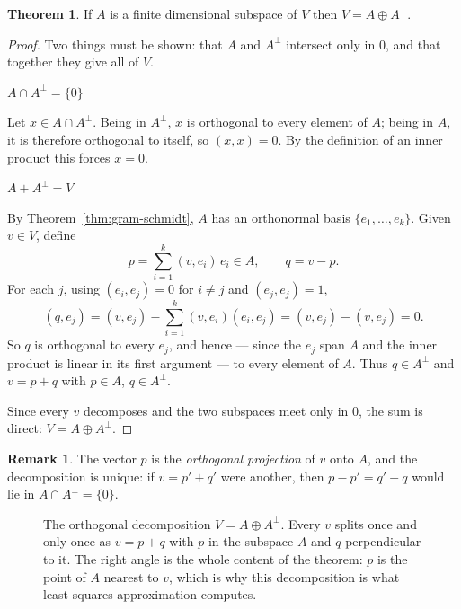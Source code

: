 \documentclass[11pt,a4paper]{article}
\theoremstyle{definition}
\newtheorem{thm}{Theorem}[subsection]
\newtheorem*{remark}{Remark}
\newcommand{\subhead}[1]{%
  \par\medskip\noindent\textbf{#1}\par\nobreak\smallskip}
\begin{document}
\begin{thm}\label{thm:orthogonal-decomposition}
If $A$ is a finite dimensional subspace of $V$ then $V=A\oplus A^{\perp}$.
\end{thm}

\begin{proof}
Two things must be shown: that $A$ and $A^{\perp}$ intersect only in $0$, and
that together they give all of $V$.

\subhead{$A\cap A^{\perp}=\{0\}$}
Let $x\in A\cap A^{\perp}$. Being in $A^{\perp}$, $x$ is orthogonal to every
element of $A$; being in $A$, it is therefore orthogonal to itself, so
$(x,x)=0$. By the definition of an inner product this forces $x=0$.

\subhead{$A+A^{\perp}=V$}
By Theorem~\ref{thm:gram-schmidt}, $A$ has an orthonormal basis
$\{e_1,\dots,e_k\}$. Given $v\in V$, define
$$p=\sum_{i=1}^{k}(v,e_i)\,e_i\in A,\qquad q=v-p.$$
For each $j$, using $(e_i,e_j)=0$ for $i\neq j$ and $(e_j,e_j)=1$,
$$(q,e_j)=(v,e_j)-\sum_{i=1}^{k}(v,e_i)(e_i,e_j)=(v,e_j)-(v,e_j)=0.$$
So $q$ is orthogonal to every $e_j$, and hence --- since the $e_j$ span $A$ and
the inner product is linear in its first argument --- to every element of $A$.
Thus $q\in A^{\perp}$ and $v=p+q$ with $p\in A$, $q\in A^{\perp}$.

Since every $v$ decomposes and the two subspaces meet only in $0$, the sum is
direct: $V=A\oplus A^{\perp}$.
\end{proof}

\begin{remark}
The vector $p$ is the \emph{orthogonal projection} of $v$ onto $A$, and the
decomposition is unique: if $v=p'+q'$ were another, then $p-p'=q'-q$ would lie
in $A\cap A^{\perp}=\{0\}$.
\end{remark}

\begin{figure}[H]
\centering
{}
\caption{The orthogonal decomposition $V=A\oplus A^{\perp}$. Every $v$ splits
once and only once as $v=p+q$ with $p$ in the subspace $A$ and $q$
perpendicular to it. The right angle is the whole content of the theorem: $p$
is the point of $A$ nearest to $v$, which is why this decomposition is what
least squares approximation computes.}
\label{fig:orthogonal-decomposition}
\end{figure}
\end{document}

